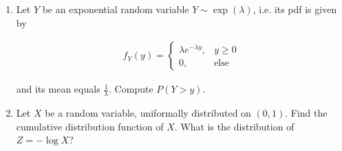 
\begin{exercise}

\phantom{}

\begin{enumerate}

    \item Let $Y$ be an exponential random variable $Y \sim \exp(\lambda)$, i.e. its pdf is given by
    
    \begin{align*}
        f_Y(y)
        =
        \begin{cases}
            \lambda e^{-\lambda y}, & y \geq 0 \\
            0,                      & \text{else}
        \end{cases}
    \end{align*}

    and its mean equals $\frac{1}{\lambda}$.
    Compute $P(Y > y)$.

    \item Let $X$ be a random variable, uniformally distributed on $(0, 1)$.
    Find the cumulative distribution function of $X$.
    What is the distribution of $Z = -\log X$?

\end{enumerate}

\end{exercise}


